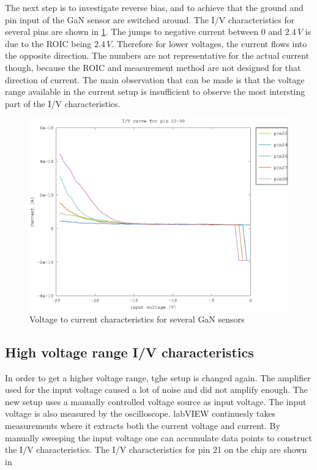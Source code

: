 The next step is to investigate reverse bias, and to achieve that the ground and pin input of the GaN sensor are switched around. The I/V characteristics for several pins are shown in \cref{fig:pin22_30_slope}. The jumps to negative current between 0 and $2.4\,V$ is due to the ROIC being $2.4\,V$. Therefore for lower voltages, the current flows into the opposite direction. The numbers are not representative for the actual current though, because the ROIC and measurement method are not designed for that direction of current. The main observation that can be made is that the voltage range available in the current setup is insufficient to observe the most intersting part of the I/V characteristics.  

\begin{figure}[h]
	    \centering
	    \includegraphics[width=\textwidth]{fig/pin22-30_slope_-25-0V.eps}
	    \caption[]%
	    {Voltage to current characteristics for several GaN sensors}    
	    \label{fig:pin22_30_slope}	
\end{figure}  


\subsection{High voltage range I/V characteristics}
In order to get a higher voltage range, tghe setup is changed again. The amplifier used for the input voltage caused a lot of noise and did not amplify enough. The new setup uses a manually controlled voltage source as input voltage. The input voltage is also measured by the oscilloscope. labVIEW continuesly takes measurements where it extracts both the current voltage and current. By manually sweeping the input voltage one can accumulate data points to construct the I/V characteristics. The I/V characteristics for pin 21 on the chip are shown in



